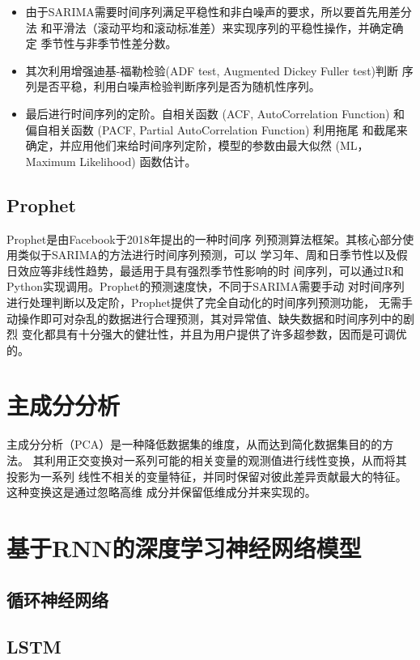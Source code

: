 \documentclass[AutoFakeBold]{LZUThesis}
\begin{document}
\begin{itemize}
\item 由于SARIMA需要时间序列满足平稳性和非白噪声的要求，所以要首先用差分法
和平滑法（滚动平均和滚动标准差）来实现序列的平稳性操作，并确定确定
季节性与非季节性差分数。
\item 其次利用增强迪基-福勒检验(ADF test, Augmented Dickey Fuller test)判断
序列是否平稳，利用白噪声检验判断序列是否为随机性序列。
\item 最后进行时间序列的定阶。自相关函数 (ACF, AutoCorrelation Function)
和偏自相关函数 (PACF, Partial AutoCorrelation Function) 利用拖尾
和截尾来确定，并应用他们来给时间序列定阶，模型的参数由最大似然 (ML，Maximum
Likelihood) 函数估计。
\end{itemize}

\subsection{Prophet}
Prophet\cite{taylor2018forecasting}是由Facebook于2018年提出的一种时间序
列预测算法框架。其核心部分使用类似于SARIMA的方法进行时间序列预测，可以
学习年、周和日季节性以及假日效应等非线性趋势，最适用于具有强烈季节性影响的时
间序列，可以通过R和Python实现调用。Prophet的预测速度快，不同于SARIMA需要手动
对时间序列进行处理判断以及定阶，Prophet提供了完全自动化的时间序列预测功能，
无需手动操作即可对杂乱的数据进行合理预测，其对异常值、缺失数据和时间序列中的剧烈
变化都具有十分强大的健壮性，并且为用户提供了许多超参数，因而是可调优的。
\section{主成分分析}
主成分分析（PCA）是一种降低数据集的维度，从而达到简化数据集目的的方法。
其利用正交变换对一系列可能的相关变量的观测值进行线性变换，从而将其投影为一系列
线性不相关的变量特征，并同时保留对彼此差异贡献最大的特征。这种变换这是通过忽略高维
成分并保留低维成分并来实现的。

\section{基于RNN的深度学习神经网络模型}
\subsection{循环神经网络}

\subsection{LSTM}
\end{document}
